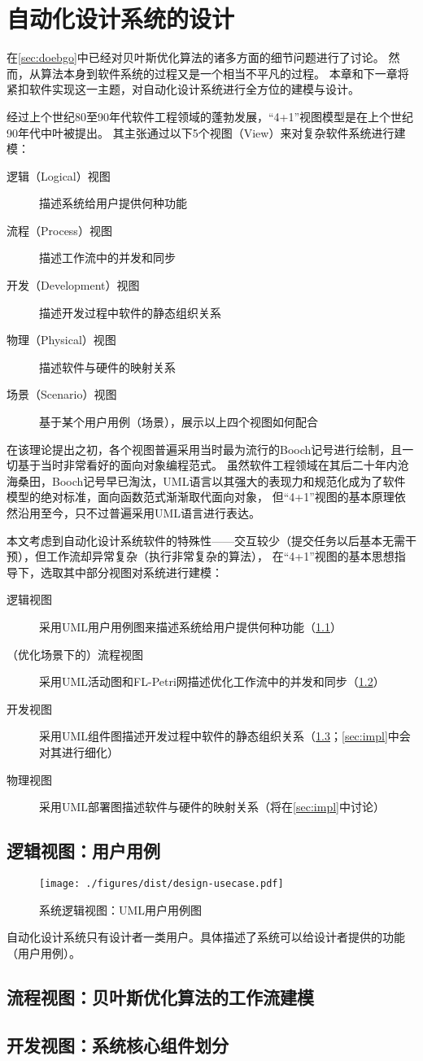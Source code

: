 \documentclass[index]{subfiles}
\begin{document}
\chapter{自动化设计系统的设计}\label{sec:design}
在\cref{sec:doebgo}中已经对贝叶斯优化算法的诸多方面的细节问题进行了讨论。
然而，从算法本身到软件系统的过程又是一个相当不平凡的过程。
本章和下一章将紧扣软件实现这一主题，对自动化设计系统进行全方位的建模与设计。

经过上个世纪80至90年代软件工程领域的蓬勃发展，“4+1”视图模型\cite{kruchten1995}是在上个世纪90年代中叶被提出。
其主张通过以下5个视图（View）来对复杂软件系统进行建模：
\begin{description}
  \item[逻辑（Logical）视图] 描述系统给用户提供何种功能
  \item[流程（Process）视图] 描述工作流中的并发和同步
  \item[开发（Development）视图] 描述开发过程中软件的静态组织关系
  \item[物理（Physical）视图] 描述软件与硬件的映射关系
  \item[场景（Scenario）视图] 基于某个用户用例（场景），展示以上四个视图如何配合
\end{description}

在该理论提出之初，各个视图普遍采用当时最为流行的Booch记号进行绘制，且一切基于当时非常看好的面向对象编程范式。
虽然软件工程领域在其后二十年内沧海桑田，Booch记号早已淘汰，UML语言以其强大的表现力和规范化成为了软件模型的绝对标准，面向函数范式渐渐取代面向对象，
但“4+1”视图的基本原理依然沿用至今，只不过普遍采用UML语言进行表达。

本文考虑到自动化设计系统软件的特殊性——交互较少（提交任务以后基本无需干预），但工作流却异常复杂（执行非常复杂的算法），
在“4+1”视图的基本思想指导下，选取其中部分视图对系统进行建模：
\begin{description}
  \item[逻辑视图] 采用UML用户用例图来描述系统给用户提供何种功能（\cref{sec:design-usecase}）
  \item[（优化场景下的）流程视图] 采用UML活动图和FL-Petri网描述优化工作流中的并发和同步（\cref{sec:design-wf}）
  \item[开发视图] 采用UML组件图描述开发过程中软件的静态组织关系（\cref{sec:design-comp}；\cref{sec:impl}中会对其进行细化）
  \item[物理视图] 采用UML部署图描述软件与硬件的映射关系（将在\cref{sec:impl}中讨论）
\end{description}

\section{逻辑视图：用户用例}\label{sec:design-usecase}
\begin{figure}[h]
  \centering
  \texttt{[image: ./figures/dist/design-usecase.pdf]}
  \caption{系统逻辑视图：UML用户用例图\label{fig:design-usecase}}
\end{figure}
自动化设计系统只有设计者一类用户。具体描述了系统可以给设计者提供的功能（用户用例）。

\section{流程视图：贝叶斯优化算法的工作流建模}\label{sec:design-wf}
\section{开发视图：系统核心组件划分}\label{sec:design-comp}
\end{document}
